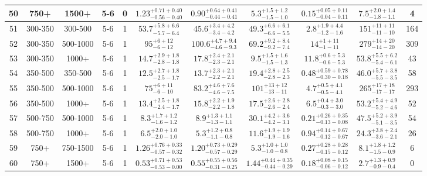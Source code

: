 \documentclass[11pt, oneside]{article}
\begin{document}
\begin{table}
{\begin{tabular}{ |c|c|c|c|c||c|c|c|c||c|c| }
50 & 750+ & 1500+ & 5-6 & 0 & $1.23^{+0.71+0.40}_{-0.56-0.40}$ & $0.90^{+0.64+0.41}_{-0.44-0.41}$ & $5.3^{+1.5+1.2}_{-1.5-1.0}$ & $0.15^{+0.05+0.11}_{-0.04-0.11}$ & $7.5^{+2.0+1.4}_{-1.8-1.1}$ & 4 \\ \hline
51 & 300-350 & 300-500 & 5-6 & 1 & $53.7^{+5.8+6.6}_{-5.7-6.4}$ & $45.6^{+3.4+4.2}_{-3.4-4.2}$ & $49.3^{+6.6+6.1}_{-6.6-5.5}$ & $2.8^{+1.9+4.4}_{-1.2-1.6}$ & $151^{+11+11}_{-11-10}$ & 164 \\ \hline
52 & 300-350 & 500-1000 & 5-6 & 1 & $95^{+ 6+12}_{- 6-12}$ & $100.6^{+4.7+9.4}_{-4.6-9.3}$ & $69.2^{+9.2+8.4}_{-9.2-7.4}$ & $14^{+ 1+11}_{- 1-11}$ & $279^{+14+20}_{-14-20}$ & 309 \\ \hline
53 & 300-350 & 1000+ & 5-6 & 1 & $14.7^{+2.9+1.8}_{-2.8-1.8}$ & $17.8^{+2.4+2.1}_{-2.3-2.1}$ & $9.5^{+1.5+1.6}_{-1.5-1.3}$ & $11.8^{+0.6+5.3}_{-0.6-5.3}$ & $53.8^{+5.5+6.2}_{-5.4-6.1}$ & 43 \\ \hline
54 & 350-500 & 350-500 & 5-6 & 1 & $12.5^{+2.7+1.8}_{-2.5-1.7}$ & $13.7^{+2.3+2.1}_{-2.2-2.1}$ & $19.4^{+2.8+2.5}_{-2.8-2.3}$ & $0.48^{+0.59+0.78}_{-0.30-0.18}$ & $46.0^{+5.7+3.8}_{-5.5-3.5}$ & 58 \\ \hline
55 & 350-500 & 500-1000 & 5-6 & 1 & $75^{+ 6+11}_{- 6-10}$ & $83.2^{+4.6+7.6}_{-4.6-7.5}$ & $101^{+13+12}_{-13-11}$ & $4.7^{+0.5+4.1}_{-0.5-4.1}$ & $265^{+17+18}_{-17-17}$ & 293 \\ \hline
56 & 350-500 & 1000+ & 5-6 & 1 & $13.4^{+2.5+1.8}_{-2.4-1.7}$ & $15.8^{+2.2+1.9}_{-2.2-1.8}$ & $17.5^{+2.6+2.8}_{-2.6-2.4}$ & $6.5^{+0.4+3.0}_{-0.3-3.0}$ & $53.2^{+5.4+4.9}_{-5.2-4.6}$ & 52 \\ \hline
57 & 500-750 & 500-1000 & 5-6 & 1 & $8.3^{+1.7+1.2}_{-1.6-1.2}$ & $8.9^{+1.3+1.1}_{-1.3-1.1}$ & $30.1^{+4.2+3.6}_{-4.2-3.1}$ & $0.21^{+0.26+0.35}_{-0.13-0.08}$ & $47.5^{+5.2+3.9}_{-5.1-3.5}$ & 54 \\ \hline
58 & 500-750 & 1000+ & 5-6 & 1 & $6.5^{+2.0+1.0}_{-2.0-1.0}$ & $5.3^{+1.2+0.8}_{-1.1-0.8}$ & $11.6^{+1.9+1.9}_{-1.9-1.6}$ & $0.94^{+0.14+0.67}_{-0.12-0.67}$ & $24.3^{+3.8+2.4}_{-3.6-2.1}$ & 26 \\ \hline
59 & 750+ & 750-1500 & 5-6 & 1 & $1.26^{+0.76+0.33}_{-0.57-0.32}$ & $1.20^{+0.73+0.29}_{-0.57-0.29}$ & $5.3^{+1.0+1.0}_{-1.0-0.8}$ & $0.27^{+0.28+0.28}_{-0.15-0.12}$ & $8.1^{+1.8+1.2}_{-1.5-0.9}$ & 6 \\ \hline
60 & 750+ & 1500+ & 5-6 & 1 & $0.53^{+0.71+0.53}_{-0.53-0.00}$ & $0.55^{+0.55+0.56}_{-0.31-0.25}$ & $1.44^{+0.44+0.35}_{-0.44-0.29}$ & $0.18^{+0.08+0.15}_{-0.06-0.12}$ & $2.7^{+1.3+0.9}_{-0.9-0.4}$ & 0 \\ \hline

\end{tabular}}
\end{table}
\end{document}
